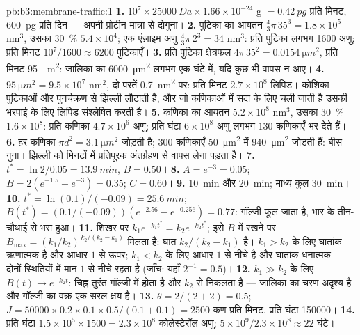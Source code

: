 \begin{solution}{pb:b3:membrane-traffic:1}
\textbf{1.} $10^{7}\times \qty{25000}{Da}\times 1.66\times 10^{-24}$ g
$= \qty{0.42}{pg}$ प्रति मिनट, \qty{600}{pg} प्रति दिन --- अपनी
प्रोटीन-मात्रा से दोगुना।
\textbf{2.} पुटिका का आयतन $\tfrac{4}{3}\pi\,35^{3} = 1.8\times 10^{5}$
nm$^{3}$, उसका \qty{30}{\%} $5.4\times 10^{4}$; एक एंज़ाइम अणु
$\tfrac{4}{3}\pi\,2^{3} = 34$ nm$^{3}$: प्रति पुटिका लगभग \num{1600}
अणु; प्रति मिनट $10^{7}/1600 \approx 6200$ पुटिकाएँ।
\textbf{3.} प्रति पुटिका क्षेत्रफल $4\pi\,35^{2} = \qty{0.0154}{\micro m^2}$, प्रति मिनट \qty{95}{\micro
m^2}: जालिका का \qty{6000}{\micro m^2} लगभग एक घंटे में, यदि कुछ भी
वापस न आए।
\textbf{4.} $\qty{95}{\micro m^2} = 9.5\times 10^{7}$ nm$^{2}$, दो परतें
\qty{0.7}{nm^2} पर: प्रति मिनट $2.7\times 10^{8}$ लिपिड। कोशिका 
पुटिकाओं और पुनर्चक्रण से झिल्ली लौटाती है, और जो कणिकाओं में सदा के
लिए चली जाती है उसकी भरपाई के लिए लिपिड संश्लेषित करती है।
\textbf{5.} कणिका का आयतन $5.2\times 10^{8}$ nm$^{3}$, उसका \qty{30}{\%}
$1.6\times 10^{8}$: प्रति कणिका $4.7\times 10^{6}$ अणु; प्रति घंटा $6\times
10^{8}$ अणु लगभग $130$ कणिकाएँ भर देते हैं।
\textbf{6.} हर कणिका $\pi d^{2} = \qty{3.1}{\micro m^2}$ जोड़ती है; $300$
कणिकाएँ \qty{50}{\micro m^2} में \qty{940}{\micro m^2} जोड़ती हैं:
बीस गुना। झिल्ली को मिनटों में प्रतिपूरक अंतर्ग्रहण से वापस लेना पड़ता है।
\textbf{7.} $t^{*} = \ln 2/0.05 = \qty{13.9}{min}$, $B = 0.50$।
\textbf{8.} $A = e^{-3} = 0.05$; $B = 2(e^{-1.5} - e^{-3}) = 0.35$;
$C = 0.60$।
\textbf{9.} \qty{10}{min} और \qty{20}{min}; माध्य कुल \qty{30}{min}।
\textbf{10.} $t^{*} = \ln(0.1)/(-0.09) = \qty{25.6}{min}$; $B(t^{*}) =
(0.1/(-0.09))(e^{-2.56} - e^{-0.256}) = 0.77$: गॉल्जी फूल जाता है, भार
के तीन-चौथाई से भरा हुआ।
\textbf{11.} शिखर पर $k_{1}e^{-k_{1}t^{*}} = k_{2}e^{-k_{2}t^{*}}$;
इसे $B$ में रखने पर $B_{\max} = (k_{1}/k_{2})^{\,k_{2}/(k_{2} -
k_{1})}$ मिलता है: घात $k_{2}/(k_{2} - k_{1})$ है। $k_{1} > k_{2}$ के
लिए घातांक ऋणात्मक है और आधार $1$ से ऊपर; $k_{1} < k_{2}$ के लिए
आधार $1$ से नीचे है और घातांक धनात्मक --- दोनों स्थितियों में मान
$1$ से नीचे रहता है (जाँच: यहाँ $2^{-1} = 0.5$)।
\textbf{12.} $k_{1} \gg k_{2}$ के लिए $B(t) \to e^{-k_{2}t}$: चिह्न
तुरंत गॉल्जी में होता है और $k_{2}$ से निकलता है --- जालिका का चरण
अदृश्य है और गॉल्जी का वक्र एक सरल क्षय है।
\textbf{13.} $\theta = 2/(2+2) = 0.5$; $J = \num{50000}\times 0.2\times
0.1\times 0.5/(0.1 + 0.1) = 2500$ कण प्रति मिनट, प्रति घंटा \num{150000}।
\textbf{14.} प्रति घंटा $1.5\times 10^{5}\times 1500 = 2.3\times 10^{8}$
कोलेस्टेरॉल अणु; $5\times 10^{9}/2.3\times 10^{8} \approx 22$ घंटे।

\end{solution}
